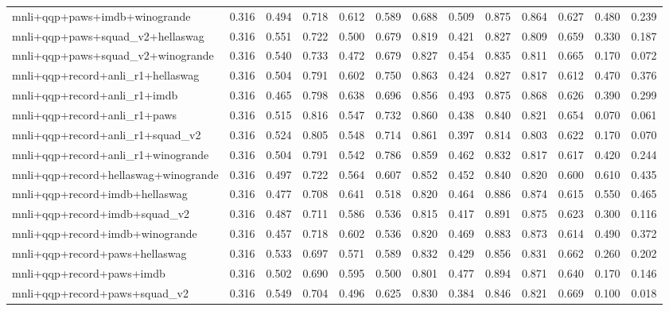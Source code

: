 \begin{table}[t]
\begin{tabular}{lrrrrrrrrrrrr}
    mnli+qqp+paws+imdb+winogrande & 0.316 & 0.494 & 0.718 & 0.612 & 0.589 & 0.688 & 0.509 & 0.875 & 0.864 & 0.627 & 0.480 & 0.239 \\
    mnli+qqp+paws+squad\_v2+hellaswag & 0.316 & 0.551 & 0.722 & 0.500 & 0.679 & 0.819 & 0.421 & 0.827 & 0.809 & 0.659 & 0.330 & 0.187 \\
    mnli+qqp+paws+squad\_v2+winogrande & 0.316 & 0.540 & 0.733 & 0.472 & 0.679 & 0.827 & 0.454 & 0.835 & 0.811 & 0.665 & 0.170 & 0.072 \\
    mnli+qqp+record+anli\_r1+hellaswag & 0.316 & 0.504 & 0.791 & 0.602 & 0.750 & 0.863 & 0.424 & 0.827 & 0.817 & 0.612 & 0.470 & 0.376 \\
    mnli+qqp+record+anli\_r1+imdb & 0.316 & 0.465 & 0.798 & 0.638 & 0.696 & 0.856 & 0.493 & 0.875 & 0.868 & 0.626 & 0.390 & 0.299 \\
    mnli+qqp+record+anli\_r1+paws & 0.316 & 0.515 & 0.816 & 0.547 & 0.732 & 0.860 & 0.438 & 0.840 & 0.821 & 0.654 & 0.070 & 0.061 \\
    mnli+qqp+record+anli\_r1+squad\_v2 & 0.316 & 0.524 & 0.805 & 0.548 & 0.714 & 0.861 & 0.397 & 0.814 & 0.803 & 0.622 & 0.170 & 0.070 \\
    mnli+qqp+record+anli\_r1+winogrande & 0.316 & 0.504 & 0.791 & 0.542 & 0.786 & 0.859 & 0.462 & 0.832 & 0.817 & 0.617 & 0.420 & 0.244 \\
    mnli+qqp+record+hellaswag+winogrande & 0.316 & 0.497 & 0.722 & 0.564 & 0.607 & 0.852 & 0.452 & 0.840 & 0.820 & 0.600 & 0.610 & 0.435 \\
    mnli+qqp+record+imdb+hellaswag & 0.316 & 0.477 & 0.708 & 0.641 & 0.518 & 0.820 & 0.464 & 0.886 & 0.874 & 0.615 & 0.550 & 0.465 \\
    mnli+qqp+record+imdb+squad\_v2 & 0.316 & 0.487 & 0.711 & 0.586 & 0.536 & 0.815 & 0.417 & 0.891 & 0.875 & 0.623 & 0.300 & 0.116 \\
    mnli+qqp+record+imdb+winogrande & 0.316 & 0.457 & 0.718 & 0.602 & 0.536 & 0.820 & 0.469 & 0.883 & 0.873 & 0.614 & 0.490 & 0.372 \\
    mnli+qqp+record+paws+hellaswag & 0.316 & 0.533 & 0.697 & 0.571 & 0.589 & 0.832 & 0.429 & 0.856 & 0.831 & 0.662 & 0.260 & 0.202 \\
    mnli+qqp+record+paws+imdb & 0.316 & 0.502 & 0.690 & 0.595 & 0.500 & 0.801 & 0.477 & 0.894 & 0.871 & 0.640 & 0.170 & 0.146 \\
    mnli+qqp+record+paws+squad\_v2 & 0.316 & 0.549 & 0.704 & 0.496 & 0.625 & 0.830 & 0.384 & 0.846 & 0.821 & 0.669 & 0.100 & 0.018 \\

\end{tabular}
\end{table}
